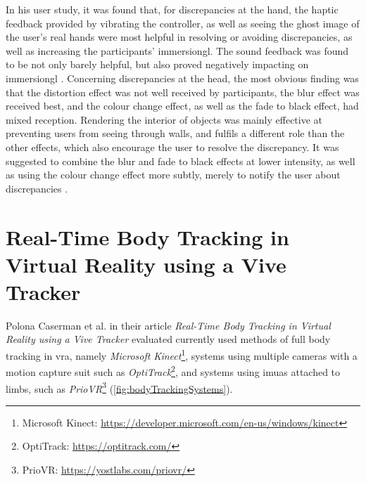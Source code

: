 In his user study, it was found that, for discrepancies at the hand, the haptic feedback provided by vibrating the controller, as well as seeing the ghost image of the user's real hands were most helpful in resolving or avoiding discrepancies, as well as increasing the participants' \gls{immersiongl}. The sound feedback was found to be not only barely helpful, but also proved negatively impacting on \gls{immersiongl} \autocite[p. ~29-34]{JohnnyVEThesis}.
\newline
Concerning discrepancies at the head, the most obvious finding was that the distortion effect was not well received by participants, the blur effect was received best, and the colour change effect, as well as the fade to black effect, had mixed reception. Rendering the interior of objects was mainly effective at preventing users from seeing through walls, and fulfils a different role than the other effects, which also encourage the user to resolve the discrepancy. It was suggested to combine the blur and fade to black effects at lower intensity, as well as using the colour change effect more subtly, merely to notify the user about discrepancies  \autocite[p. ~35-39]{JohnnyVEThesis}.

\section{Real-Time Body Tracking in Virtual Reality using a Vive Tracker}

Polona Caserman et al. in their article \textit{Real-Time Body Tracking in Virtual Reality using a Vive Tracker} \autocite{bodyTrackingVR} evaluated currently used methods of full body tracking in \gls{vra}, namely \textit{Microsoft Kinect}\footnote{Microsoft Kinect: \url{https://developer.microsoft.com/en-us/windows/kinect}}, systems using multiple cameras with a motion capture suit such as \textit{OptiTrack}\footnote{OptiTrack: \url{https://optitrack.com/}}, and systems using \glspl{imua} attached to limbs, such as \textit{PrioVR}\footnote{PrioVR: \url{https://yostlabs.com/priovr/}} (\autoref{fig:bodyTrackingSystems}).

